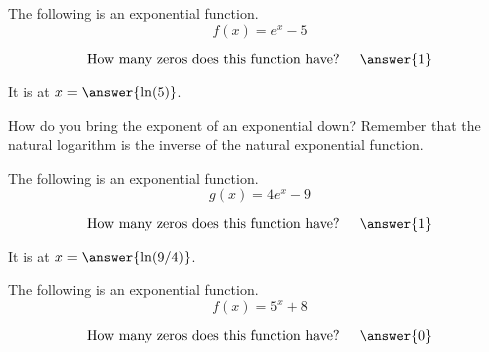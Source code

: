 \documentclass{ximera}
\author{Bobby Ramsey}
\begin{document}
\begin{exercise}
	The following is an exponential function.
	$$f(x) = e^x - 5$$
	
	$$ \text{How many zeros does this function have? } \quad \answer{1} $$
	
	\begin{exercise}
		It is at $x = \answer{\ln(5)}$.
		\begin{hint}
			How do you bring the exponent of an exponential down?  Remember that the natural logarithm is the inverse of the natural exponential function.
		\end{hint}
	\end{exercise}
\end{exercise}


\begin{exercise}
	The following is an exponential function.
	$$g(x) = 4e^x - 9$$
	
	$$ \text{How many zeros does this function have? } \quad \answer{1} $$
	
	\begin{exercise}
		It is at $x = \answer{\ln(9/4)}$.
	\end{exercise}
\end{exercise}


\begin{exercise}
	The following is an exponential function.
	$$f(x) = 5^x + 8$$
	
	$$ \text{How many zeros does this function have? } \quad \answer{0} $$
	
\end{exercise}
\end{document}
